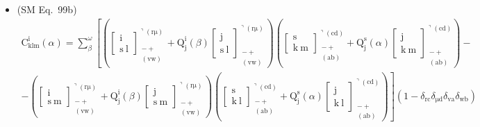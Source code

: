 \documentclass[12pt]{article}
\begin{document}
\begin{itemize}[label={},leftmargin=0pt]
    \item (SM Eq.\ 99b) 
    \[
    \begin{gathered}
    \mathrm{C}^\mathrm{i}_{\mathrm{klm}}(\alpha) = \sum_\beta^\omega \left[ \left( \left[ \begin{smallmatrix} \mathrm{i} \\ \mathrm{s\ l} \end{smallmatrix} \right]^{\urcorner(\mathrm{r\mu})}_{\substack{- + \\ (\mathrm{vw})}} + \mathrm{Q}^\mathrm{i}_\mathrm{j}(\beta) \left[ \begin{smallmatrix} \mathrm{j} \\ \mathrm{s\ l} \end{smallmatrix} \right]^{\urcorner(\mathrm{r\mu})}_{\substack{- + \\ (\mathrm{vw})}} \right) \left( \left[ \begin{smallmatrix} \mathrm{s} \\ \mathrm{k\ m} \end{smallmatrix} \right]^{\urcorner(\mathrm{cd})}_{\substack{- + \\ (\mathrm{ab})}} + \mathrm{Q}^\mathrm{s}_\mathrm{j}(\alpha) \left[ \begin{smallmatrix} \mathrm{j} \\ \mathrm{k\ m} \end{smallmatrix} \right]^{\urcorner(\mathrm{cd})}_{\substack{- + \\ (\mathrm{ab})}} \right) - \right. \\
    \left. - \left( \left[ \begin{smallmatrix} \mathrm{i} \\ \mathrm{s\ m} \end{smallmatrix} \right]^{\urcorner(\mathrm{r\mu})}_{\substack{- + \\ (\mathrm{vw})}} + \mathrm{Q}^\mathrm{i}_\mathrm{j}(\beta) \left[ \begin{smallmatrix} \mathrm{j} \\ \mathrm{s\ m} \end{smallmatrix} \right]^{\urcorner(\mathrm{r\mu})}_{\substack{- + \\ (\mathrm{vw})}} \right) \left( \left[ \begin{smallmatrix} \mathrm{s} \\ \mathrm{k\ l} \end{smallmatrix} \right]^{\urcorner(\mathrm{cd})}_{\substack{- + \\ (\mathrm{ab})}} + \mathrm{Q}^\mathrm{s}_\mathrm{j}(\alpha) \left[ \begin{smallmatrix} \mathrm{j} \\ \mathrm{k\ l} \end{smallmatrix} \right]^{\urcorner(\mathrm{cd})}_{\substack{- + \\ (\mathrm{ab})}} \right) \right] (1 - \delta_{\mathrm{rc}}\delta_{\mathrm{\mu d}}\delta_{\mathrm{va}}\delta_{\mathrm{wb}}) \\

\end{gathered}\]
\end{itemize}
\end{document}
